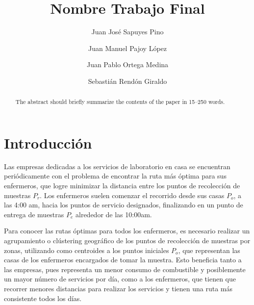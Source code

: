 \documentclass[runningheads]{llncs}
\begin{document}
%
\title{Nombre Trabajo Final}
%
%
\author{Juan José Sapuyes Pino \and
    Juan Manuel Pajoy López \and
    Juan Pablo Ortega Medina \and
    Sebastián Rendón Giraldo}
%
%
%
\maketitle              %
%
\begin{abstract}
    The abstract should briefly summarize the contents of the paper in
    15--250 words.

\end{abstract}

\section{Introducción}
Las empresas dedicadas a los servicios de laboratorio en casa se encuentran
periódicamente con el problema de encontrar la ruta más óptima para sus enfermeros,
que logre minimizar la distancia entre los puntos de recolección de muestras
$P_{r}$. Los enfermeros suelen comenzar el recorrido desde sus casas $P_o$,
a las 4:00 am, hacia los puntos de servicio designados, finalizando en un
punto de entrega de muestras $P_e$ alrededor de las 10:00am.

Para conocer las rutas óptimas para todos los enfermeros, es necesario realizar
un agrupamiento o clústering geográfico de los puntos de recolección de muestras
por zonas, utilizando como centroides a los puntos iniciales $P_o$,
que representan las casas de los enfermeros encargados de tomar la muestra.
Esto beneficia tanto a las empresas, pues representa un menor consumo de
combustible y posiblemente un mayor número de servicios por día, como a los
enfermeros, que tienen que recorrer menores distancias para realizar los servicios
y tienen una ruta más consistente todos los días.

%
%
%


\end{document}
